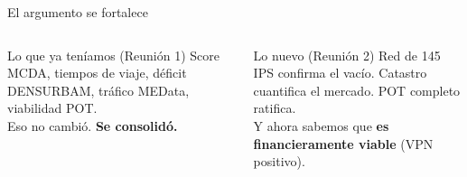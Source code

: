 \documentclass[aspectratio=169, 11pt]{beamer}
\begin{document}
{\begin{frame}{El argumento se fortalece}
\vspace{12pt}
\begin{columns}[T]
\begin{exampleblock}{\small Lo que ya teníamos (Reunión 1)}
\small Score MCDA, tiempos de viaje, déficit DENSURBAM, tráfico MEData, viabilidad POT.\\[2pt]
Eso no cambió. \textbf{Se consolidó.}
\end{exampleblock}

\begin{block}{\small Lo nuevo (Reunión 2)}
\small Red de 145 IPS confirma el vacío. Catastro cuantifica el mercado. POT completo ratifica.\\[2pt]
Y ahora sabemos que \textbf{es financieramente viable} (VPN positivo).
\end{block}
\end{columns}
\end{frame}
}
\end{document}
